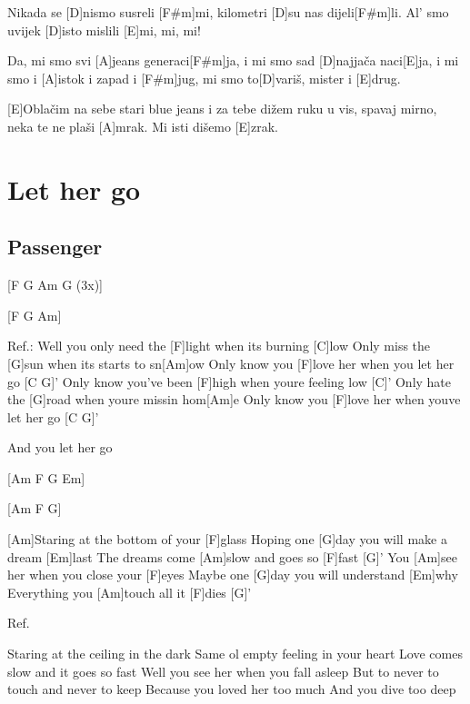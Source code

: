 \documentclass[a4paper,12pt]{article}
\begin{document}
\begin{multicols}{2}
\begin{guitar}
[F#m]Nikada se [D]nismo susreli [F#m]mi,
kilometri [D]su nas dijeli[F#m]li.
Al' smo uvijek [D]isto mislili [E]mi, mi, mi!

Da, mi smo svi [A]jeans generaci[F#m]ja,
i mi smo sad [D]najjača naci[E]ja,
i mi smo i [A]istok i zapad i [F#m]jug,
mi smo to[D]variš, mister i [E]drug.


[E]Oblačim na sebe stari blue jeans
i za tebe dižem ruku u vis,
spavaj mirno, neka te ne plaši [A]mrak.
Mi isti dišemo [E]zrak.


\end{guitar}
\section{Let her go}
\subsection*{Passenger}
\begin{guitar}

[F    G   Am   G (3x)]

[F      G      Am]

Ref.:                                               
Well you only need the [F]light 
when its burning [C]low
Only miss the [G]sun 
when its starts to sn[Am]ow
Only know you [F]love her 
when you let her go [C   G]'
Only know you’ve been [F]high 
when youre feeling low [C]'
Only hate the [G]road 
when youre missin hom[Am]e
Only know you [F]love her 
when youve let her go [C   G]'

And you let her go




[Am     F     G     Em]

[Am    F     G]




[Am]Staring at the bottom of your [F]glass
Hoping one [G]day you will make a dream [Em]last
The dreams come [Am]slow and goes so [F]fast [G]'
You [Am]see her when you close your [F]eyes
Maybe one [G]day you will understand [Em]why
Everything you [Am]touch all it [F]dies [G]'



Ref.



Staring at the ceiling in the dark
Same ol empty feeling in your heart
Love comes slow and it goes so fast
Well you see her when you fall asleep
But to never to touch and never to keep
Because you loved her too much
And you dive too deep




\end{guitar}
\end{multicols}
\end{document}
